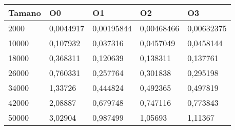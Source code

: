 \begin{tabular}{|l|l|l|l|l|}
	\hline
	Tamano & O0 & O1 & O2 & O3 \\
	\hline
	\hline
	2000 & 0,0044917 & 0,00195844 & 0,00468466 & 0,00632375 \\
	\hline
	10000 & 0,107932 & 0,037316 & 0,0457049 & 0,0458144 \\
	\hline
	18000 & 0,368311 & 0,120639 & 0,138311 & 0,137761 \\
	\hline
	26000 & 0,760331 & 0,257764 & 0,301838 & 0,295198 \\
	\hline
	34000 & 1,33726 & 0,444824 & 0,492365 & 0,497819 \\
	\hline
	42000 & 2,08887 & 0,679748 & 0,747116 & 0,773843 \\
	\hline
	50000 & 3,02904 & 0,987499 & 1,05693 & 1,11367 \\
	\hline
\end{tabular}
